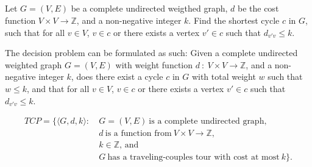 \subsection{}

Let $G = (V,E)$ be a complete undirected weigthed graph, $d$ be the
cost function $V \times V \to \mathbb{Z}$, and a non-negative integer
$k$. Find the shortest cycle $c$ in $G$, such that for all $v \in V$,
$v \in c$ or there exists a vertex $v' \in c$ such that $d_{v'v} \leq
k$.

The decision problem can be formulated as such: Given a complete
undirected weighted graph $G=(V,E)$ with weight function $d ~ : ~ V
\times V \to \mathbb{Z}$, and a non-negative integer $k$, does there
exist a cycle $c$ in $G$ with total weight $w$ such that $w \leq k$,
and that for all $v \in V$, $v \in c$ or there exists a vertex $v' \in
c$ such that $d_{v'v} \leq k$.

\begin{align*}
  TCP = \{ \langle G, d, k\rangle : ~ & G = (V,E) ~ \text{is a complete
    undirected graph}, \\
  & d ~ \text{is a function from} ~ V \times V \to \mathbb{Z}, \\
  & k \in \mathbb{Z} \textrm{, and} \\
  & G ~\text{has a traveling-couples tour with cost at most} ~ k\} .\\
\end{align*}
